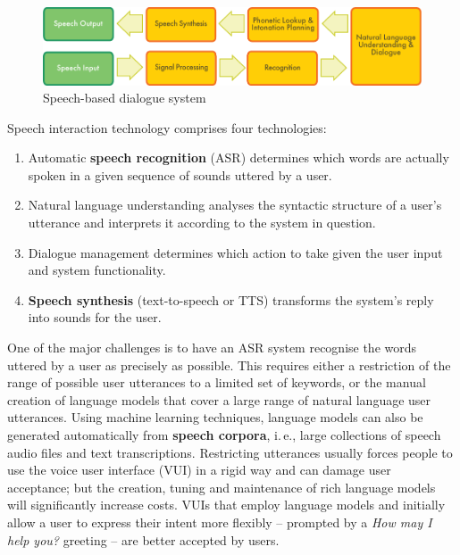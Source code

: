 \documentclass[]{../../metanetpaper}
\begin{document}
\begin{multicols}{2}

\begin{figure}[htb]
  \center
  \includegraphics[width=\textwidth]{../_media/english/simple_speech-based_dialogue_architecture}
  \caption{Speech-based dialogue system}
  \label{fig:dialoguearch_en}
\end{figure}

Speech interaction technology comprises four technologies: 

\begin{enumerate}
\item Automatic \textbf{speech recognition} (ASR) determines which words are actually spoken in a given sequence of sounds uttered by a user.  
\item Natural language understanding analyses the syntactic structure of a user’s utterance and interprets it according to the system in question.
\item Dialogue management determines which action to take given the user input and system functionality.   
\item \textbf{Speech synthesis} (text-to-speech or TTS) transforms the system’s reply into sounds for the user.
\end{enumerate}

One of the major challenges is to have an ASR system recognise the words uttered by a user as precisely as possible. This requires either a restriction of the range of possible user utterances to a limited set of keywords, or the manual creation of language models that cover a large range of natural language user utterances. Using machine learning techniques, language models can also be generated automatically from \textbf{speech corpora}, i.\,e., large collections of speech audio files and text transcriptions. Restricting utterances usually forces people to use the voice user interface (VUI) in a rigid way and can damage user acceptance; but the creation, tuning and maintenance of rich language models will significantly increase costs. VUIs that employ language models and initially allow a user to express their intent more flexibly -- prompted by a \textit{How may I help you?} greeting -- are better accepted by users.


\end{multicols}
\end{document}

